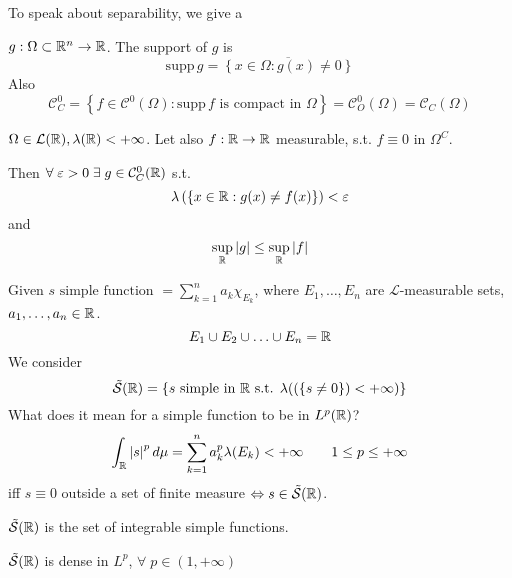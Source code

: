 To speak about separability, we give a 
\begin{definition}
    \(g: \Omega \subset \mathbb{R}^n \to \mathbb{R}\). The support of \(g\) is
    \[
      \mbox{supp}\, g = \overline{\left\{ x \in \Omega : g(x) \neq 0 \right\}}
    \]
    Also 
    \[
        \mathcal{C}^0_C = \left\{ f \in \mathcal{C}^0\left( \Omega \right) : \mbox{supp} \, f \mbox{ is compact in } \Omega\right\} = \mathcal{C}^0_O(\Omega) = \mathcal{C}_C(\Omega)
    \]
\end{definition}
\begin{theorem}
    \(\Omega \in \mathcal{L}(\mathbb{R}), \lambda(\mathbb{R}) < +\infty\). Let also \(f : \mathbb{R} \to \mathbb{R}\) measurable, s.t. \(f\equiv 0\) in \(\Omega^C\).

    Then \(\forall \; \varepsilon > 0 \; \exists \; g \in \mathcal{C}^0_C(\mathbb{R})\) s.t.
    \[
        \lambda \left( \left\{ x \in \mathbb{R} : g(x) \neq f(x) \right\} \right) < \varepsilon
    \]
    and
    \[
        \sup_{\mathbb{R}} \abs{g} \leq \sup_{\mathbb{R}} \abs{f}
    \]
\end{theorem}
\begin{definition}
    Given \(s \mbox{ simple function } = \sum_{k=1}^n a_k \chi_{E_k}\), where \(E_1, \ldots, E_n\) are \(\mathcal{L}\)-measurable sets, \(a_1, \ldots, a_n \in \mathbb{R}\). 
    \[
        E_1 \cup E_2 \cup \ldots \cup E_n = \mathbb{R}
    \]
    We consider
    \[
        \tilde{\mathcal{S}}(\mathbb{R}) = \left\{ s \mbox{ simple in } \mathbb{R} \mbox{ s.t. } \lambda(\left( \left\{ s \neq 0 \right\} \right) < +\infty) \right\}
    \]
    What does it mean for a simple function to be in \(L^p(\mathbb{R})\)? 
    \[
        \int_{\mathbb{R}} \abs{s}^p \, d\mu = \sum_{k=1}^n a_k^p \lambda(E_k) < +\infty
    \tag*{\(1 \leq p \leq +\infty\)}\]
    iff \(s \equiv 0\) outside a set of finite measure \(\Leftrightarrow s \in \tilde{\mathcal{S}}(\mathbb{R})\).

    \(\tilde{\mathcal{S}}(\mathbb{R})\) is the set of integrable simple functions.
\end{definition}
\begin{theorem}
    \(\tilde{\mathcal{S}}(\mathbb{R})\) is dense in \(L^p\), \(\forall \; p \in (1, +\infty)\)
\end{theorem}

